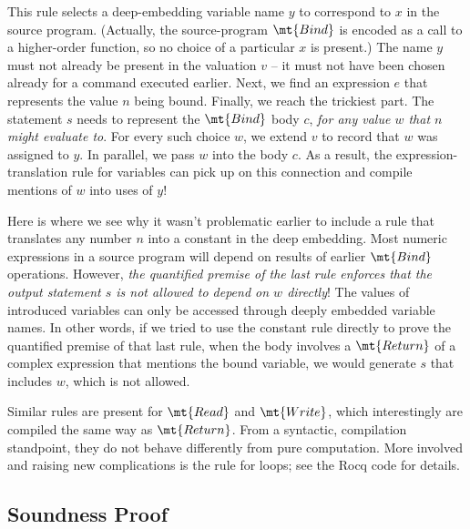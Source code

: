 \documentclass{amsbook}
\theoremstyle{definition}
\theoremstyle{remark}
\numberwithin{section}{chapter}
\numberwithin{equation}{chapter}
\begin{document}
This rule selects a deep-embedding variable name $y$ to correspond to $x$ in the source program.
(Actually, the source-program $\mt{Bind}$ is encoded as a call to a higher-order function, so no choice of a particular $x$ is present.)
The name $y$ must not already be present in the valuation $v$ -- it must not have been chosen already for a command executed earlier.
Next, we find an expression $e$ that represents the value $n$ being bound.
Finally, we reach the trickiest part.
The statement $s$ needs to represent the $\mt{Bind}$ body $c$, \emph{for any value $w$ that $n$ might evaluate to}.
For every such choice $w$, we extend $v$ to record that $w$ was assigned to $y$.
In parallel, we pass $w$ into the body $c$.
As a result, the expression-translation rule for variables can pick up on this connection and compile mentions of $w$ into uses of $y$!

Here is where we see why it wasn't problematic earlier to include a rule that translates any number $n$ into a constant in the deep embedding.
Most numeric expressions in a source program will depend on results of earlier $\mt{Bind}$ operations.
However, \emph{the quantified premise of the last rule enforces that the output statement $s$ is not allowed to depend on $w$ directly}!
The values of introduced variables can only be accessed through deeply embedded variable names.
In other words, if we tried to use the constant rule directly to prove the quantified premise of that last rule, when the body involves a $\mt{Return}$ of a complex expression that mentions the bound variable, we would generate $s$ that includes $w$, which is not allowed.

Similar rules are present for $\mt{Read}$ and $\mt{Write}$, which interestingly are compiled the same way as $\mt{Return}$.
From a syntactic, compilation standpoint, they do not behave differently from pure computation.
More involved and raising new complications is the rule for loops; see the Rocq code for details.

\subsection{Soundness Proof}
\end{document}
